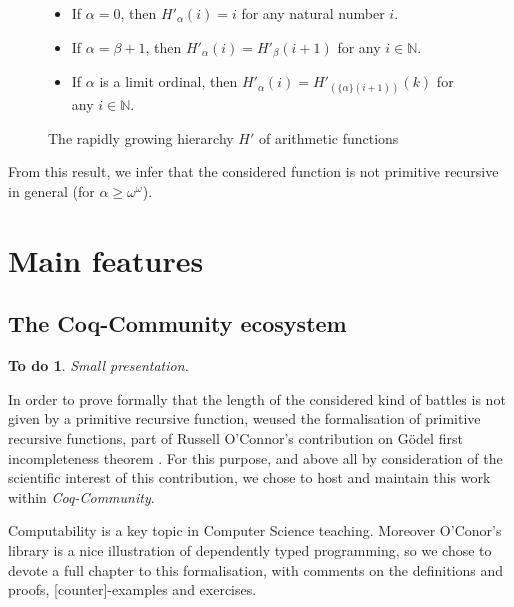 \documentclass{easychair}
\makeatletter
\newcommand{\inputsnippets}[1]
  {{\setlength{\itemsep}{1pt}\setlength{\parsep}{0pt}%
    \alectryon@copymacros\begin{io}
      \forcsvlist{\item\@inputsnippet}{#1}
    \end{io}}}
\let@old Save definition of 
\newcommand{\@inputsnippet}[1]
  {{\renewenvironment{alectryon}{}{}%
    @old{../movies/snippets/#1}}}
\newcommand{\canonseq}[2]{\mbox{$\{#1\}(#2)$}}
\newtheorem{todo}{To do}
\makeatother
\begin{document}
\begin{figure}[h]
  \centering
  \begin{itemize}
\item If $\alpha=0$, then $H'_\alpha (i)= i$ for any natural number $i$.
\item If $\alpha=\beta+1$, then 
$H'_\alpha(i)=H'_\beta(i+1)$ for any $i \in \mathbb{N}$.
\item If $\alpha$ is a limit ordinal, then 
$H'_\alpha(i) = H'_{(\canonseq{\alpha}{i+1})}(k)$ for any $i\in \mathbb{N}$.
\end{itemize}
\vspace{4pt}
\inputsnippets{Hprime/HprimeDef}
\caption{The rapidly growing hierarchy $H'$ of arithmetic functions}
\label{fig:Hprime}
\end{figure}

\label{sect:not-pr}
From this result, we infer that the considered function is not primitive recursive in general (for $\alpha\geq\omega^\omega$).


 
\section{Main features}




\subsection{The Coq-Community ecosystem}
\begin{todo}
Small presentation.
\end{todo}

In order to prove formally that the length of the considered
kind of battles is not given by a primitive recursive function, weused the formalisation of primitive recursive functions, part
of Russell O'Connor's contribution on G\"{o}del first incompleteness theorem \cite{OConnor05, Goedel}.
For this purpose, and above all by consideration of the scientific interest of this contribution, we chose to host and maintain this work within \textit{Coq-Community}.

Computability is a key topic in Computer Science teaching. Moreover O'Conor's library is a nice illustration of dependently typed programming, so we chose to devote a full chapter to this formalisation, with comments on the definitions and proofs, [counter]-examples and exercises.
\end{document}
